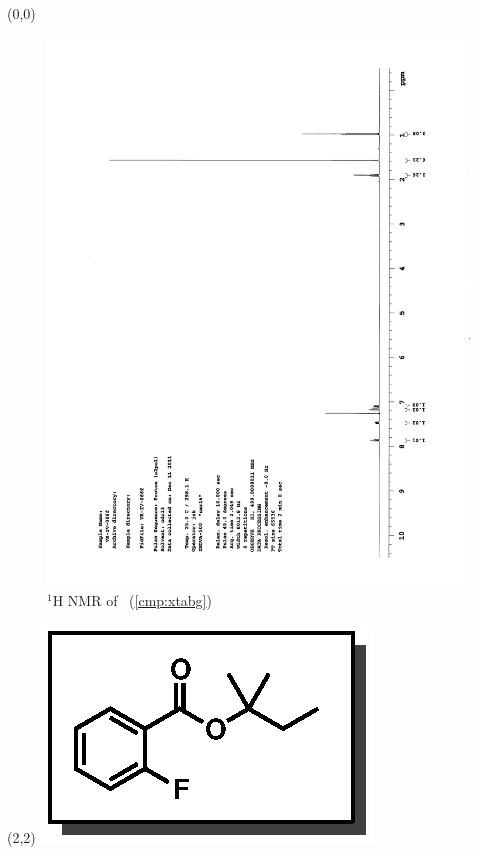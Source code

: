 \begin{textblock}{20}(0,0)
\begin{figure}[htb]
\caption{$^1$H NMR of \CMPxtabg\ (\ref{cmp:xtabg})}
\includegraphics[scale=0.75, trim = 0mm 0mm 0mm 5mm,
clip]{chp_asymmetric/images/nmr/xtabgH}
\vspace{-100pt}
\end{figure}
\end{textblock}
\begin{textblock}{1}(2,2)
\includegraphics[scale=0.8, angle=90]{chp_asymmetric/images/xtabg}
\end{textblock}

